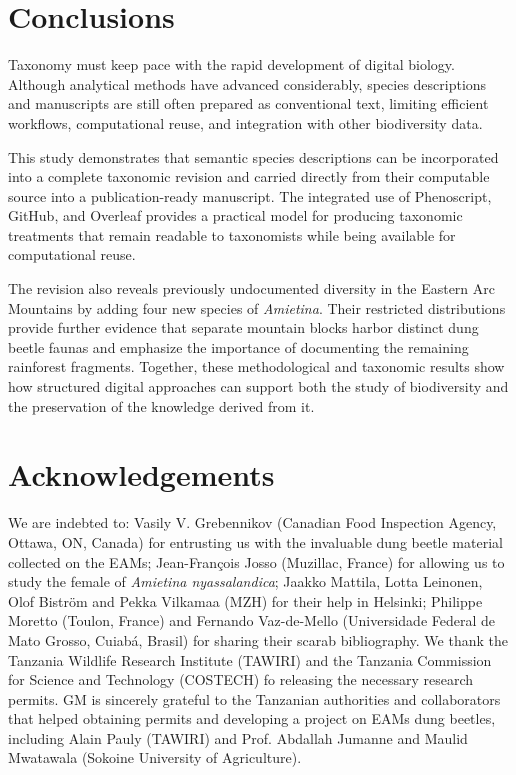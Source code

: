 \documentclass[fleqn,10pt,lineno]{wlpeerj}
\begin{document}
\section*{Conclusions}

Taxonomy must keep pace with the rapid development of digital biology. Although analytical methods have advanced considerably, species descriptions and manuscripts are still often prepared as conventional text, limiting efficient workflows, computational reuse, and integration with other biodiversity data.

This study demonstrates that semantic species descriptions can be incorporated into a complete taxonomic revision and carried directly from their computable source into a publication-ready manuscript. The integrated use of Phenoscript, GitHub, and Overleaf provides a practical model for producing taxonomic treatments that remain readable to taxonomists while being available for computational reuse.

The revision also reveals previously undocumented diversity in the Eastern Arc Mountains by adding four new species of \textit{Amietina}. Their restricted distributions provide further evidence that separate mountain blocks harbor distinct dung beetle faunas and emphasize the importance of documenting the remaining rainforest fragments. Together, these methodological and taxonomic results show how structured digital approaches can support both the study of biodiversity and the preservation of the knowledge derived from it.

\section*{Acknowledgements}
We are indebted to: Vasily V. Grebennikov (Canadian Food Inspection Agency, Ottawa, ON, Canada) for entrusting us with the invaluable dung beetle material collected on the EAMs; Jean-Fran\c{c}ois Josso (Muzillac, France) for allowing us to study the female of \textit{Amietina nyassalandica}; Jaakko Mattila, Lotta Leinonen, Olof Biström and Pekka Vilkamaa (MZH) for their help in Helsinki; Philippe Moretto (Toulon, France) and Fernando Vaz-de-Mello (Universidade Federal de Mato Grosso, Cuiab\'a, Brasil) for sharing their scarab bibliography. We thank the Tanzania Wildlife Research Institute (TAWIRI) and the Tanzania Commission for Science and Technology (COSTECH) fo releasing the necessary research permits. GM is sincerely grateful to the Tanzanian authorities and collaborators that helped obtaining permits and developing a project on EAMs dung beetles, including Alain Pauly (TAWIRI) and Prof. Abdallah Jumanne and Maulid Mwatawala (Sokoine University of Agriculture). 
\end{document}
